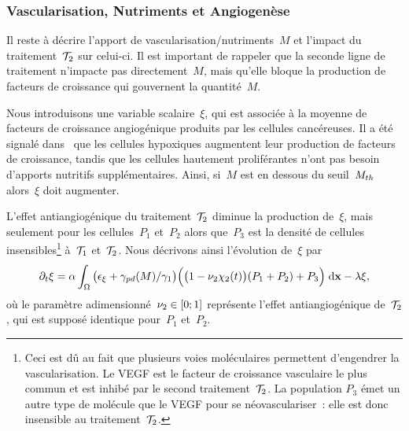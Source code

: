 \documentclass[main.tex]{subfiles}
\begin{document}



\subsubsection{Vascularisation, Nutriments et Angiogenèse}
Il reste à décrire l'apport de vascularisation/nutriments~$M$ 
et l'impact du traitement~${\mathcal T_2}$ sur celui-ci. Il est important de rappeler que la seconde ligne de traitement n'impacte pas directement~$M$, mais qu'elle bloque la production de facteurs de croissance qui gouvernent la quantité~$M$.

Nous introduisons une variable scalaire~$\xi$, qui est associée à la moyenne de facteurs de croissance angiogénique produits par les cellules cancéreuses. 
Il a été signalé dans~\cite{Holmes2007} que les cellules hypoxiques augmentent leur production de facteurs de croissance, tandis que les cellules hautement proliférantes n'ont pas besoin d'apports nutritifs supplémentaires. Ainsi, si~$M$ est en dessous du seuil~$M_{th}$ alors~$\xi$ doit augmenter.  

L'effet antiangiogénique du 
traitement~${\mathcal T_2}$ diminue la production
de~$\xi$, mais seulement pour les cellules~$P_1$ et~$P_2$ alors que~$P_3$ est la densité de cellules insensibles\footnote{Ceci est dû au fait que plusieurs voies moléculaires permettent d'engendrer la vascularisation. Le VEGF est le facteur de croissance vasculaire le plus commun  et est inhibé par le second traitement~${\mathcal T_2}$. La population $P_3$ émet un autre type de molécule que le VEGF pour se néovasculariser~: elle est donc insensible au traitement~${\mathcal T_2}$.} à~${\mathcal T_1}$ et~${\mathcal T_2}$.
Nous décrivons ainsi l'évolution de~$\xi$ par
\begin{equation}\label{eq_xi}
\partial_t \xi = \alpha \int_\Omega \big( \epsilon_{\xi} + \gamma_{pd}(M) / \gamma_1  \big)\Big(\big(1-\nu_2\chi_2(t)\big)(P_1+P_2)+P_3\Big) \textrm{\;d}\mathbf{x} - \lambda \xi, 
\end{equation}
où le paramètre adimensionné~$\nu_2\in [0;1]$ représente l'effet antiangiogénique de~${\mathcal T_2}$, qui est supposé identique pour~$P_1$ et~$P_2$.
\end{document}
